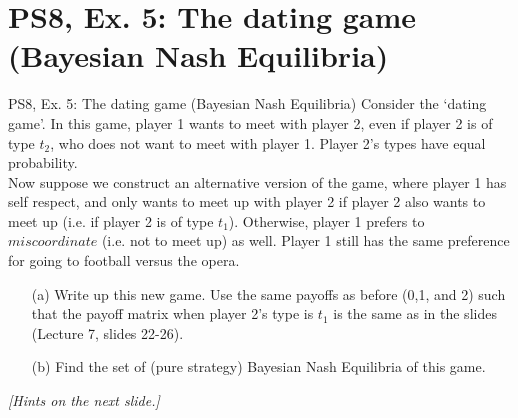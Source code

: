 \section{PS8, Ex. 5: The dating game (Bayesian Nash Equilibria)}

\begin{frame}{PS8, Ex. 5: The dating game (Bayesian Nash Equilibria)}
    Consider the ‘dating game’. In this game, player 1 wants to meet with player 2, even if player 2 is of type $t_2$, who does not want to meet with player 1. Player 2’s types have equal probability.\\\medskip
    Now suppose we construct an alternative version of the game, where player 1 has self respect, and only wants to meet up with player 2 if player 2 also wants to meet up (i.e. if player 2 is of type $t_1$). Otherwise, player 1 prefers to $miscoordinate$ (i.e. not to meet up) as well. Player 1 still has the same preference for going to football versus the opera.
    \begin{itemize}
      \item[(a)] Write up this new game. Use the same payoffs as before (0,1, and 2) such that the payoff matrix when player 2’s type is $t_1$ is the same as in the slides (Lecture 7, slides 22-26).
      \item[(b)] Find the set of (pure strategy) Bayesian Nash Equilibria of this game.
    \end{itemize}
    \textit{[Hints on the next slide.]}
    \vfill\null
\end{frame}
